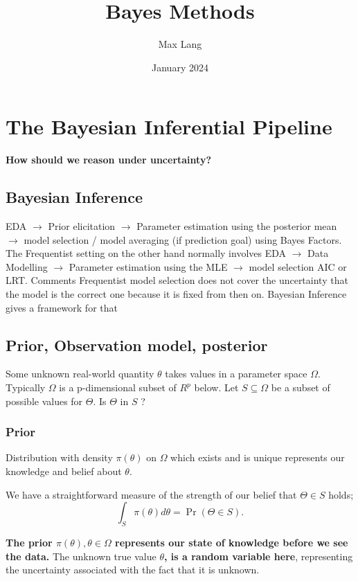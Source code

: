\documentclass{article}
\title{Bayes Methods}
\author{Max Lang}
\date{January 2024}
\begin{document}
\maketitle
\section{The Bayesian Inferential Pipeline}
\textbf{How should we reason under uncertainty? }

\subsection{Bayesian Inference}
EDA $\rightarrow$ Prior elicitation $\rightarrow$ Parameter estimation using the  posterior mean $\rightarrow$ model selection / model averaging (if prediction goal) using Bayes Factors.
\newline
\newline
The Frequentist setting on the other hand normally involves EDA $\rightarrow$ Data Modelling $\rightarrow$ Parameter estimation using the MLE $\rightarrow$ model selection AIC or LRT.
\newline
\textbf{}{Comments}
 Frequentist model selection does not cover the uncertainty that the model is the correct one because it is fixed from then on. Bayesian Inference gives a framework for that

\subsection{Prior, Observation model, posterior}

Some unknown real-world quantity $\theta$ takes values in a parameter space $\Omega$. Typically $\Omega$ is a p-dimensional subset of $R^p$ below. Let $S \subseteq \Omega$ be a subset of possible values for $\Theta$. Is $\Theta$ in $S$ ?

\subsubsection{Prior}
Distribution  with density $\pi(\theta)$ on $\Omega$ which exists and is unique represents our  knowledge and belief about $\theta$.

We have a straightforward measure of the strength of our belief that $\Theta \in S$ holds;
$$
\int_S \pi(\theta) d \theta=\operatorname{Pr}(\Theta \in S) .
$$

\textbf{The prior $\pi(\theta), \theta \in \Omega$ represents our state of knowledge before we see the data.} The unknown true value \textbf{$\theta$, is a random variable here}, representing the uncertainty associated with the fact that it is unknown. 
\end{document}
